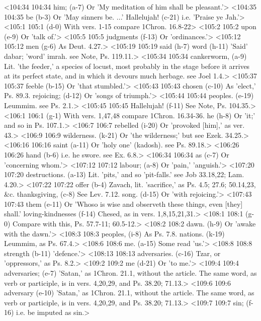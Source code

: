 <104:34 104:34  him; (a-7)  Or 'My meditation of him shall be pleasant.'>
<104:35 104:35  be (b-3)  Or 'May sinners be. ...'
  Hallelujah! (c-21)  i.e. 'Praise ye Jah.'>
<105:1 105:1   (d-0)  With vers. 1-15 compare 1Chron. 16.8-22>
<105:2 105:2  upon (e-9)  Or 'talk of.'>
<105:5 105:5  judgments (f-13)  Or 'ordinances.'>
<105:12 105:12  men (g-6)  As Deut. 4.27.>
<105:19 105:19  said (h-7)  word (h-11)
  'Said' dabar; 'word' imrah. see Note, Ps. 119.11.>
<105:34 105:34  cankerworm, (a-9)  Lit. 'the feeder,' a species of locust, most probably in the  stage before it arrives at its perfect state, and in which it  devours much herbage. see Joel 1.4.>
<105:37 105:37  feeble (b-15)  Or 'that stumbled.'>
<105:43 105:43  chosen (c-10)  As 'elect,' Ps. 89.3.
  rejoicing; (d-12)  Or 'songs of triumph.'>
<105:44 105:44  peoples. (e-19)  Leummim. see Ps. 2.1.>
<105:45 105:45  Hallelujah! (f-11)  See Note, Ps. 104.35.>
<106:1 106:1   (g-1)  With vers. 1,47,48 compare 1Chron. 16.34-36.
  he (h-8)  Or 'it;' and so in Ps. 107.1.>
<106:7 106:7  rebelled (i-20)  Or 'provoked [him],' as ver. 43.>
<106:9 106:9  wilderness. (k-21)  Or 'the wilderness;' but see Ezek. 34.25.>
<106:16 106:16  saint (a-11)  Or 'holy one' (kadosh). see Ps. 89.18.>
<106:26 106:26  hand (b-6)  i.e. he swore. see Ex. 6.8.>
<106:34 106:34  as (c-7)  Or 'concerning whom.'>
<107:12 107:12  labour; (a-8)  Or 'pain,' 'anguish.'>
<107:20 107:20  destructions. (a-13)  Lit. 'pits,' and so 'pit-falls.' see Job 33.18,22; Lam. 4.20.>
<107:22 107:22  offer (b-4)  Zavach, lit. 'sacrifice,' as Ps. 4.5; 27.6; 50.14,23, &c.
  thanksgiving, (c-8)  See Lev. 7.12.
  song. (d-15)  Or 'with rejoicing.'>
<107:43 107:43  them (e-11)  Or 'Whoso is wise and observeth these things, even [they]  shall.'
  loving-kindnesses (f-14)  Chesed, as in vers. 1,8,15,21,31.>
<108:1 108:1   (g-0)  Compare with this, Ps. 57.7-11; 60.5-12.>
<108:2 108:2  dawn. (h-9)  Or 'awake with the dawn.'>
<108:3 108:3  peoples, (i-8)  As Ps. 7.8.
  nations. (k-19)  Leummim, as Ps. 67.4.>
<108:6 108:6  me. (a-15)  Some read 'us.'>
<108:8 108:8  strength (b-11)  'defence.'>
<108:13 108:13  adversaries. (c-16)  Tzar, or 'oppressors,' as Ps. 8.2.>
<109:2 109:2  me (d-21)  Or 'to me.'>
<109:4 109:4  adversaries; (e-7)  'Satan,' as 1Chron. 21.1, without the article. The same word,  as verb or participle, is in vers. 4,20,29, and Ps. 38.20; 71.13.>
<109:6 109:6  adversary (e-10)  'Satan,' as 1Chron. 21.1, without the article. The same word,  as verb or participle, is in vers. 4,20,29, and Ps. 38.20; 71.13.>
<109:7 109:7  sin; (f-16)  i.e. be imputed as sin.>
